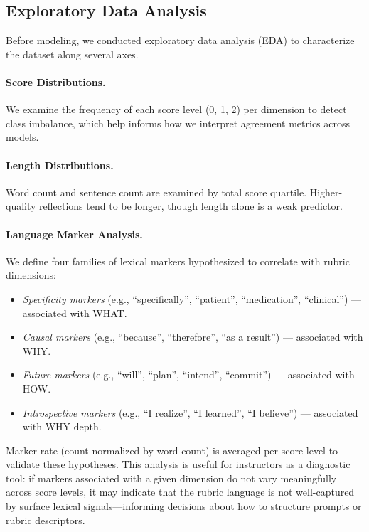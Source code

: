 \documentclass[11pt]{article}
\begin{document}
\subsection{Exploratory Data Analysis}

Before modeling, we conducted exploratory data analysis (EDA) to characterize the dataset along several axes.

\paragraph{Score Distributions.} We examine the frequency of each score level (0, 1, 2) per dimension to detect class imbalance, which help informs how we interpret agreement metrics across models.


\paragraph{Length Distributions.} Word count and sentence count are examined by total score quartile. Higher-quality reflections tend to be longer, though length alone is a weak predictor.

\paragraph{Language Marker Analysis.} We define four families of lexical markers hypothesized to correlate with rubric dimensions:
\begin{itemize}
    \item \textit{Specificity markers} (e.g., ``specifically'', ``patient'', ``medication'', ``clinical'') — associated with WHAT.
    \item \textit{Causal markers} (e.g., ``because'', ``therefore'', ``as a result'') — associated with WHY.
    \item \textit{Future markers} (e.g., ``will'', ``plan'', ``intend'', ``commit'') — associated with HOW.
    \item \textit{Introspective markers} (e.g., ``I realize'', ``I learned'', ``I believe'') — associated with WHY depth.
\end{itemize}
Marker rate (count normalized by word count) is averaged per score level to validate these hypotheses. This analysis is useful for instructors as a diagnostic tool: if markers associated with a given dimension do not vary meaningfully across score levels, it may indicate that the rubric language is not well-captured by surface lexical signals—informing decisions about how to structure prompts or rubric descriptors.
\end{document}
